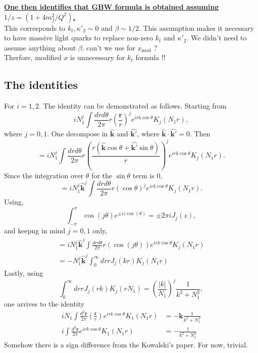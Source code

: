 \textbf{\color{blue}\underline{ One then identifies that GBW formula is obtained assuming $ 1/z=\left(1+4 m_f^2/Q^2\right)$.}}\\
This corresponds to $k_t,\kappa'_2\sim0$ and $\beta\sim 1/2$. This assumption makes it necessary to have massive light quarks to replace non-zero $k_t$ and $\kappa'_2$.
{\color{green} We didn't need to assume anything about $\beta$. can't we use for $x_\mathrm{mod}$ ?}\\

{\Large Therfore, modified $x$ is unnecessary for $k_t$ formula !!}

\subsection{The identities}
For $i=1,2$.
The identity can be demonstrated as follows.
Starting from
\begin{equation}
i N_1^j\int\frac{dr d\theta}{2\pi} r\left( \frac{\mathbf{r}}{r}\right)^j e^{i r k \cos\theta}K_j(N_1 r),
\end{equation}
where $j=0,1$.
One decompose in $\hat{\mathbf{k}}$ and $\hat{\mathbf{k}'}$, where $\hat{\mathbf{k}}\cdot \hat{\mathbf{k}'}=0$. 
Then 
\begin{equation}
=i N_1^j\int\frac{dr d\theta}{2\pi}r \left(\frac{r\left( \hat{\mathbf{k}} \cos\theta+\hat{\mathbf{k}'}\sin\theta\right)}{r}\right)^j  e^{i r k \cos\theta}K_j(N_1 r).
\end{equation}
Since the integration over $\theta$ for the $\sin\theta$ term is 0,
\begin{equation}
=i N_1^j \hat{\mathbf{k}}^j\int\frac{dr d\theta}{2\pi}r \left(  \cos\theta \right)^j  e^{i  r k \cos\theta}K_j(N_1 r).
\end{equation}
Using, 
\begin{equation}
\int^\pi_{-\pi}\cos(j \theta)e^{\pm i z \cos(\theta)}=\pm 2\pi i J_j(z),
\end{equation}
and keepng in mind $j=0,1$ only,
\begin{equation}
\begin{split}
=i N_1^j \hat{\mathbf{k}}^j\int\frac{dr d\theta}{2\pi} r  \left( \cos (j \theta)\right) e^{i rk \cos\theta}K_j(N_1 r)\\
=- N_1^j \hat{\mathbf{k}}^j\int^\infty_0 dr r J_j(kr )K_j(N_1 r)
\end{split}
\end{equation}
Lastly, using
\begin{equation}
\int^\infty_0 dr r J_j(r k) K_j( r N_1)=\left(\frac{|k|}{N_1}\right)^j\frac{1}{k^2+N_1^2},
\end{equation}
one arrives to the identity
\begin{align}
i N_1\int\frac{d^2\mathbf{r}}{2\pi} \left( \frac{\mathbf{r}}{r}\right) e^{i r k \cos\theta}K_1(N_1 r)&=-\mathbf{k} \frac{1}{k^2+N_1^2}\\
i \int\frac{d^2\mathbf{r}}{2\pi}e^{i r k \cos\theta}K_1(N_1 r)&=- \frac{1}{k^2+N_1^2}
\end{align}
{\color{red} Somehow there is a sign difference from the Kowalski's paper. For now, trivial.}

